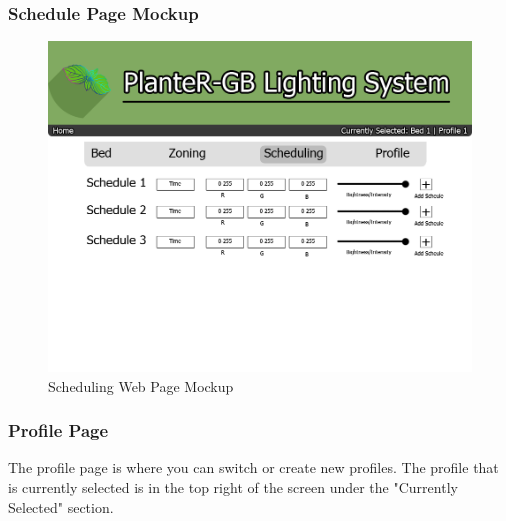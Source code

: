 \documentclass[onecolumn, draftclsnofoot,10pt, compsoc]{IEEEtran}
\begin{document}
			            \subsubsection{Schedule Page Mockup}
			            \begin{center}
			                \begin{figure}[H]
			                    \includegraphics[width=\linewidth]{web_design/SchedulingPage.png}
			                    \caption{Scheduling Web Page Mockup}
			                    \label{fig:Schedule Page}
			                \end{figure}
			            \end{center}
			            \subsubsection{Profile Page}
			            The profile page is where you can switch or create new profiles. The profile
			            that is currently selected is in the top right of the screen under the "Currently
			            Selected" section.
\end{document}

